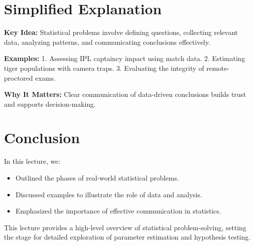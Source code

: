 \documentclass{article}
\begin{document}
\section*{Simplified Explanation}

\textbf{Key Idea:}
Statistical problems involve defining questions, collecting relevant data, analyzing patterns, and communicating conclusions effectively.

\textbf{Examples:}
1. Assessing IPL captaincy impact using match data.
2. Estimating tiger populations with camera traps.
3. Evaluating the integrity of remote-proctored exams.

\textbf{Why It Matters:}
Clear communication of data-driven conclusions builds trust and supports decision-making.

\section*{Conclusion}

In this lecture, we:
\begin{itemize}
  \item Outlined the phases of real-world statistical problems.
  \item Discussed examples to illustrate the role of data and analysis.
  \item Emphasized the importance of effective communication in statistics.
\end{itemize}

This lecture provides a high-level overview of statistical problem-solving, setting the stage for detailed exploration of parameter estimation and hypothesis testing.
\end{document}
